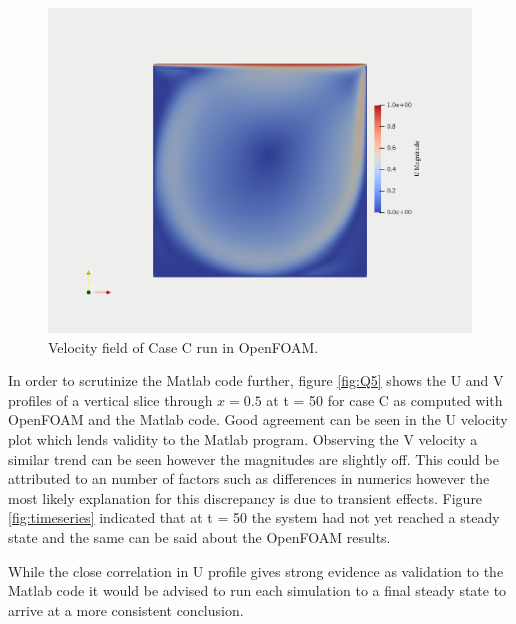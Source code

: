 \documentclass[10pt,a4paper]{article}
\begin{document}
\begin{figure}[h]
\centering
\includegraphics[width=.9\linewidth]{OpenFOAM.png}
\caption{Velocity field of Case C run in OpenFOAM.}
\label{fig:OpenFOAM}
\end{figure}

In order to scrutinize the Matlab code further, figure \ref{fig:Q5} shows the U and V profiles of a vertical slice through $x = 0.5$ at t = 50 for case C as computed with OpenFOAM and the Matlab code. Good agreement can be seen in the U velocity plot which lends validity to the Matlab program. Observing the V velocity a similar trend can be seen however the magnitudes are slightly off. This could be attributed to an number of factors such as differences in numerics however the most likely explanation for this discrepancy is due to transient effects. Figure \ref{fig:timeseries} indicated that at t = 50 the system had not yet reached a steady state and the same can be said about the OpenFOAM results. 

While the close correlation in U profile gives strong evidence as validation to the Matlab code it would be advised to run each simulation to a final steady state to arrive at a more consistent conclusion.
\end{document}
